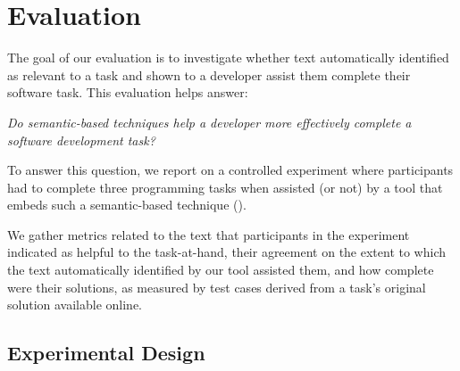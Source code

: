\clearpage

\section{Evaluation}
\label{cp6:evaluation}



The goal of our evaluation is to investigate whether text automatically identified
as relevant to a task and shown to a developer assist them complete their software task.
This evaluation helps answer: 


\medskip
\begin{bluequote}
    \textit{ Do semantic-based techniques help a 
    developer more effectively complete a software development task?} 
\end{bluequote}




To answer this question, we report on a controlled experiment where participants 
had to complete three programming tasks when assisted (or not) by a
 tool that embeds such a semantic-based technique (). 


We gather metrics related to the text that participants in the experiment indicated as helpful to the task-at-hand, their agreement on the extent to which the text automatically identified by our tool 
assisted them, and how complete were their solutions, as measured by test cases derived from a task's original solution available online.










\clearpage

\subsection{Experimental Design}



